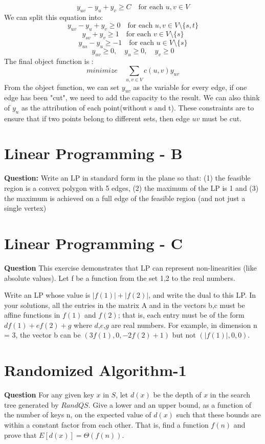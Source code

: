 \documentclass[12pt]{article}
\begin{document}
\[y_{uv}-y_u+y_v \geq C \quad \text{for each } u, v \in V\]
We can split this equation into:
\[y_{uv}-y_u+y_v \geq 0 \quad \text{for each } u, v \in V\setminus \{s, t\}\]
\[y_{sv}+y_v \geq 1 \quad \text{for each } v \in V\setminus \{s\}\]
\[y_{us}-y_u \geq -1 \quad \text{for each } u \in V\setminus \{s\}\]
\[y_{uv} \geq 0, \quad y_u \geq 0,\quad y_v\geq 0\]
The final object function is :
\[minimize \quad \sum_{u,v \in V} c(u,v)y_{uv}\]
From the object function, we can set \(y_{uv}\) as the variable for every edge, if one edge has been "cut", we need to add the capacity to the result. We can also think of \(y_u\) as the attribution of each point(without s and t). These constraints are to ensure that if two points belong to different sets, then edge \(uv\) must be cut.




\section{Linear Programming - B}
\textbf{Question:}
Write an LP in standard form in the plane so that: (1) the feasible region is a convex polygon with 5 edges, (2) the maximum of the LP is 1 and (3) the maximum is achieved on a full edge of the feasible region (and not just a single vertex)

\section{Linear Programming - C}
\textbf{Question}
This exercise demonstrates that LP can represent non-linearities (like absolute values). Let f be a function from the set {1,2} to the real numbers. 

Write an LP whose value is $|f(1)|+|f(2)|$, and write the dual to this LP. In your solutions, all the entries in the matrix A and in the vectors b,c must be affine functions in $f(1)$ and $f(2)$; that is, each entry must be of the form $d f(1) + e f(2) + g$ where $d$,$e$,$g$ are real numbers. For example, in dimension n = 3, the vector b can be $(3 f(1), 0, -2f(2)+1)$ but not $(|f(1)|,0,0)$. 


\section{Randomized Algorithm-1}
\textbf{Question}
For any given key $x$ in $S$, let $d(x)$ be the depth of $x$ in the search tree generated by $RandQS$. Give a lower and an upper bound, as a function of the number of keys n, on the expected value of $d(x)$ such that these bounds are within a constant factor from each other. That is, find a function $f(n)$ and prove that $E[d(x)]=\Theta(f(n))$.
\end{document}

